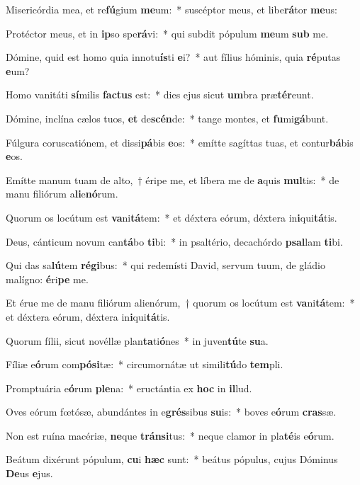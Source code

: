 \item Misericórdia mea, et re\textbf{fú}gium \textbf{me}um:~* suscéptor meus, et libe\textbf{rá}tor \textbf{me}us:
\item Protéctor meus, et in \textbf{ip}so spe\textbf{rá}vi:~* qui subdit pópulum \textbf{me}um \textbf{sub} me.
\item Dómine, quid est homo quia innotu\textbf{ís}ti \textbf{e}i?~* aut fílius hóminis, quia \textbf{ré}putas \textbf{e}um?
\item Homo vanitáti \textbf{sí}milis \textbf{fac}\textbf{tus} est:~* dies ejus sicut \textbf{um}bra præ\textbf{tér}eunt.
\item Dómine, inclína cælos tuos, \textbf{et} de\textbf{scén}de:~* tange montes, et \textbf{fu}mi\textbf{gá}bunt.
\item Fúlgura coruscatiónem, et dissi\textbf{pá}bis \textbf{e}os:~* emítte sagíttas tuas, et contur\textbf{bá}bis \textbf{e}os.
\item Emítte manum tuam de alto,~† éripe me, et líbera me de \textbf{a}quis \textbf{mul}tis:~* de manu filiórum a\textbf{li}e\textbf{nó}rum.
\item Quorum os locútum est \textbf{va}ni\textbf{tá}tem:~* et déxtera eórum, déxtera in\textbf{i}qui\textbf{tá}tis.
\item Deus, cánticum novum can\textbf{tá}bo \textbf{ti}bi:~* in psaltério, decachórdo \textbf{psal}lam \textbf{ti}bi.
\item Qui das sa\textbf{lú}tem \textbf{ré}\textbf{gi}bus:~* qui redemísti David, servum tuum, de gládio malígno: \textbf{é}ri\textbf{pe} me.
\item Et érue me de manu filiórum alienórum,~† quorum os locútum est \textbf{va}ni\textbf{tá}tem:~* et déxtera eórum, déxtera in\textbf{i}qui\textbf{tá}tis.
\item Quorum fílii, sicut novéllæ plan\textbf{ta}ti\textbf{ó}nes~* in juven\textbf{tú}te \textbf{su}a.
\item Fíliæ e\textbf{ó}rum com\textbf{pó}\textbf{si}tæ:~* circumornátæ ut simili\textbf{tú}do \textbf{tem}pli.
\item Promptuária e\textbf{ó}rum \textbf{ple}na:~* eructántia ex \textbf{hoc} in \textbf{il}lud.
\item Oves eórum fœtósæ, abundántes in e\textbf{grés}sibus \textbf{su}is:~* boves e\textbf{ó}rum \textbf{cras}sæ.
\item Non est ruína macériæ, \textbf{ne}que \textbf{tráns}\textbf{i}tus:~* neque clamor in pla\textbf{té}is e\textbf{ó}rum.
\item Beátum dixérunt pópulum, \textbf{cu}i \textbf{hæc} sunt:~* beátus pópulus, cujus Dóminus \textbf{De}us \textbf{e}jus.
